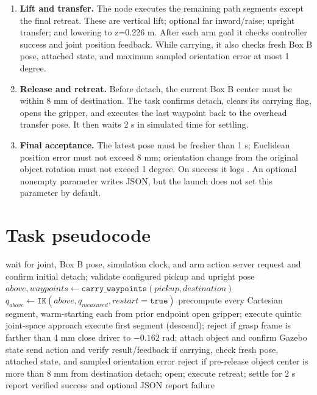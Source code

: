 \begin{enumerate}
 \item \textbf{Lift and transfer.} The node executes the remaining path
 segments except the final retreat. These are vertical lift; optional far
 inward/raise; upright transfer; and lowering to z=0.226 m. After each arm
 goal it checks controller success and joint position feedback. While
 carrying, it also checks fresh Box B pose, attached state, and maximum
 sampled orientation error at most 1 degree.

 \item \textbf{Release and retreat.} Before detach, the current Box B center
 must be within 8 mm of destination. The task confirms detach, clears its
 carrying flag, opens the gripper, and executes the last waypoint back to the
 overhead transfer pose. It then waits 2 s in simulated time for settling.

 \item \textbf{Final acceptance.} The latest pose must be fresher than 1 s;
 Euclidean position error must not exceed 8 mm; orientation change from the
 original object rotation must not exceed 1 degree. On success it logs
 . An optional nonempty 
 parameter writes JSON, but the launch does not set this parameter by default.
\end{enumerate}

\section{Task pseudocode}
\begin{algorithm}[htbp]
\caption{Source-faithful outline of }
\label{alg:pick-place}
\begin{algorithmic}[1]
\State wait for joint, Box B pose, simulation clock, and arm action server
\State request and confirm initial detach; validate configured pickup and upright pose
\State $above,waypoints\gets\texttt{carry\_waypoints}(pickup,destination)$
\State $q_{above}\gets\texttt{IK}(above,q_{measured},restart=\texttt{true})$
\State precompute every Cartesian segment, warm-starting each from prior endpoint
\State open gripper; execute quintic joint-space approach
\State execute first segment (descend); reject if grasp frame is farther than 4 mm
\State close driver to $-0.162$ rad; attach object and confirm Gazebo state
  \State send  action and verify result/feedback
  \State if carrying, check fresh pose, attached state, and sampled orientation error
\EndFor
\State reject if pre-release object center is more than 8 mm from destination
\State detach; open; execute retreat; settle for 2 s
  \State report verified success and optional JSON
\Else
  \State report failure
\EndIf
\end{algorithmic}
\end{algorithm}

